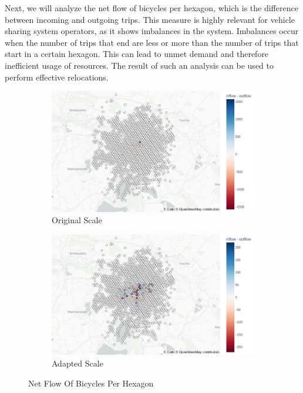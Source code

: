 Next, we will analyze the net flow of bicycles per hexagon, which is the
difference between incoming and outgoing trips. This measure is highly relevant
for vehicle sharing system operators, as it shows imbalances in the system.
Imbalances occur when the number of trips that end are less or more than the
number of trips that start in a certain hexagon. This can lead to unmet demand
and therefore inefficient usage of resources. The result of such an analysis
can be used to perform effective relocations.

\begin{figure}[htb]
    \centering
    \begin{subfigure}[b]{0.45\textwidth}
        \includegraphics[width=1\textwidth]{figures/descriptive_analysis/net_flow_original.png}
        \caption{Original Scale}
        \label{fig:descriptive_analysis_net_flow_original}
    \end{subfigure}
    \begin{subfigure}[b]{0.45\textwidth}
        \includegraphics[width=1\textwidth]{figures/descriptive_analysis/net_flow_rescaled.png}
        \caption{Adapted Scale}
        \label{fig:descriptive_analysis_net_flow_rescaled}
    \end{subfigure}
    \caption{Net Flow Of Bicycles Per Hexagon}
    \label{fig:descriptive_analysis_net_flow}
\end{figure}

